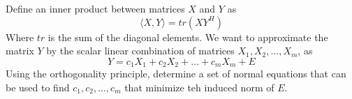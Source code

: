 \documentclass{homework}
\begin{document}
\begin{problem}[3-10]
Define an inner product between matrices $X$ and $Y$ as 
\[\langle X, Y\rangle = tr(XY^H)\]
Where $tr$ is the sum of the diagonal elements. We want to approximate the matrix $Y$ by the scalar linear combination of matrices $X_1, X_2, \dots, X_m$, as
\[ Y = c_1X_1 + c_2X_2 + \dots + c_mX_m + E\]
Using the orthogonality principle, determine a set of normal equations that can be used to find $c_1, c_2, \dots, c_m$ that minimize teh induced norm of $E$.
\end{problem}
\end{document}
